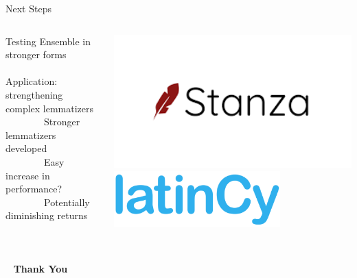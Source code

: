 \documentclass[aspectratio=169,xcolor=dvipsnames]{beamer}
\begin{document}
\begin{frame}[t]{Next Steps}

\begin{columns}
    \begin{column}{0.5\textwidth}
        Testing Ensemble in stronger forms \\ \ \\
    Application: strengthening complex lemmatizers \\
    \ \ \ \ \ \ \ \ Stronger lemmatizers developed \\
    \ \ \ \ \ \ \ \ Easy increase in performance? \\
    \ \ \ \ \ \ \ \ Potentially diminishing returns
    \end{column}
    \begin{column}{0.5\textwidth}
    \centering
        \includegraphics[width=1\textwidth]{stanza.png} \\
        \includegraphics[width=0.7\textwidth]{latincy.png} \\ \ \\
    \end{column}
\end{columns}
    
    
\end{frame}

\begin{frame}{\ }
  \centering \Huge{\textbf{\fontfamily{\rmdefault}\selectfont
  Thank You}}
\end{frame}
\end{document}
